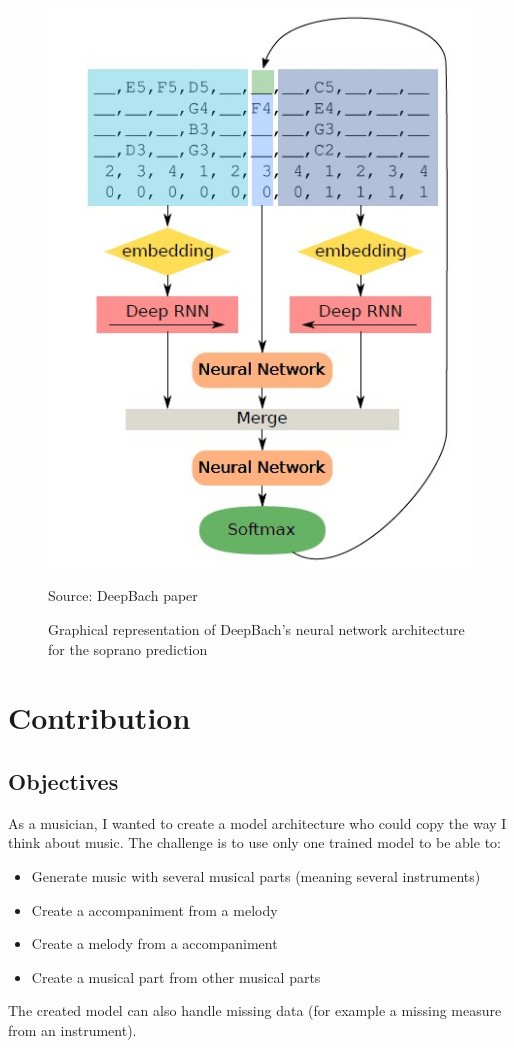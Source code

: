 \documentclass[12pt]{report}
\begin{document}
\begin{figure}[htbp]
     \centering
     \includegraphics[width=.5\linewidth]{images/related_works/deepbach/deepbach_algo.jpg}
     \caption{Graphical representation of DeepBach's neural network architecture for the soprano prediction}
     Source: DeepBach paper \cite{hadjeres_deepbach:_2016}
     \label{fig:relatedworks:deepbach_architecture}
\end{figure}

\newpage
\chapter{Contribution}
\label{chap:contribution}


\section{Objectives}
\label{sec:objectives}

As a musician, I wanted to create a model architecture who could copy the way I think about music.
The challenge is to use only one trained model to be able to:
\begin{itemize}
    \item Generate music with several musical parts (meaning several instruments)
    \item Create a accompaniment from a melody
    \item Create a melody from a accompaniment
    \item Create a musical part from other musical parts
\end{itemize}
The created model can also handle missing data (for example a missing measure from an instrument).
\end{document}
